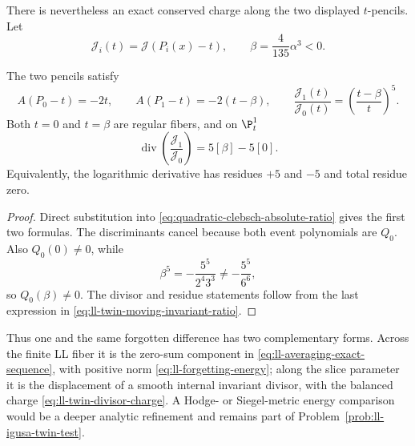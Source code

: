 There is nevertheless an exact conserved charge along the two displayed
$t$-pencils.  Let
\begin{equation}
 \mathcal J_i(t)=\mathcal J(P_i(x)-t),
 \qquad
 \beta=\frac4{135}\alpha^3<0.
 \label{eq:ll-twin-moving-invariants}
\end{equation}

\begin{corollary}
\label{cor:ll-twin-displaced-invariant-divisor}
The two pencils satisfy
\begin{equation}
 A(P_0-t)=-2t,
 \qquad
 A(P_1-t)=-2(t-\beta),
 \qquad
 \frac{\mathcal J_1(t)}{\mathcal J_0(t)}
 =\left(\frac{t-\beta}{t}\right)^5.
 \label{eq:ll-twin-moving-invariant-ratio}
\end{equation}
Both $t=0$ and $t=\beta$ are regular fibers, and on $\P^1_t$
\begin{equation}
 \operatorname{div}\!\left(\frac{\mathcal J_1}{\mathcal J_0}\right)
 =5[\beta]-5[0].
 \label{eq:ll-twin-divisor-charge}
\end{equation}
Equivalently, the logarithmic derivative has residues $+5$ and $-5$ and total
residue zero.
\end{corollary}

\begin{proof}
Direct substitution into \eqref{eq:quadratic-clebsch-absolute-ratio} gives the
first two formulas.  The discriminants cancel because both event polynomials
are $Q_0$.  Also $Q_0(0)\ne0$, while
\begin{equation}
 \beta^5
 =-\frac{5^5}{2^4 3^3}
 \ne-\frac{5^5}{6^6},
 \label{eq:ll-twin-beta-not-discriminant}
\end{equation}
so $Q_0(\beta)\ne0$.  The divisor and residue statements follow from the
last expression in \eqref{eq:ll-twin-moving-invariant-ratio}.
\end{proof}

Thus one and the same forgotten difference has two complementary forms.  Across
the finite LL fiber it is the zero-sum component in
\eqref{eq:ll-averaging-exact-sequence}, with positive norm
\eqref{eq:ll-forgetting-energy}; along the slice parameter it is the displacement
of a smooth internal invariant divisor, with the balanced charge
\eqref{eq:ll-twin-divisor-charge}.  A Hodge- or Siegel-metric energy comparison
would be a deeper analytic refinement and remains part of
Problem~\ref{prob:ll-igusa-twin-test}.

